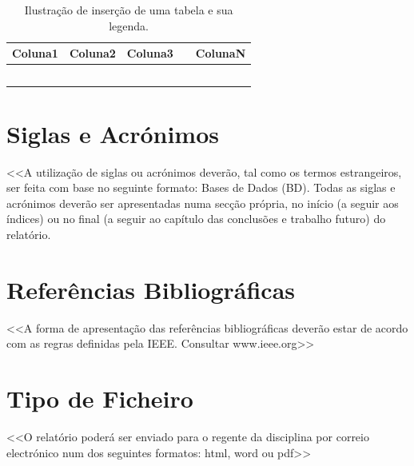 \documentclass[a4paper,12pt]{scrreprt}
\begin{document}
        \begin{table}[!h]
            \centering
            \begin{tabular}{|p{2cm}|p{2cm}|p{2cm}|p{2cm}|p{2cm}|}
               \hline
               \rowcolor{gray!20!white}
                Coluna1 & Coluna2 & Coluna3 & & ColunaN \\
                \hline
                        &         &         & &         \\
                \hline
                        &         &         & &         \\
                \hline
                        &         &         & &         \\
                \hline
                        &         &         & &         \\
                \hline
                        &         &         & &         \\
                \hline
            \end{tabular}
            \caption{Ilustração de inserção de uma tabela e sua legenda.}
        \end{table}
        
        
    \section{Siglas e Acrónimos}
        <<A utilização de siglas ou acrónimos deverão, tal como os termos estrangeiros, ser feita com base no seguinte formato: Bases de Dados (BD). Todas as siglas e acrónimos deverão ser apresentadas numa secção própria, no início (a seguir aos índices) ou no final (a seguir ao capítulo das conclusões e trabalho futuro) do relatório.
    \section{Referências Bibliográficas}
        <<A forma de apresentação das referências bibliográficas deverão estar de acordo com as regras definidas pela IEEE. Consultar www.ieee.org>>
    \section{Tipo de Ficheiro}
        <<O relatório poderá ser enviado para o regente da disciplina por correio electrónico num dos seguintes formatos: html, word ou pdf>>
   
        
\end{document}

